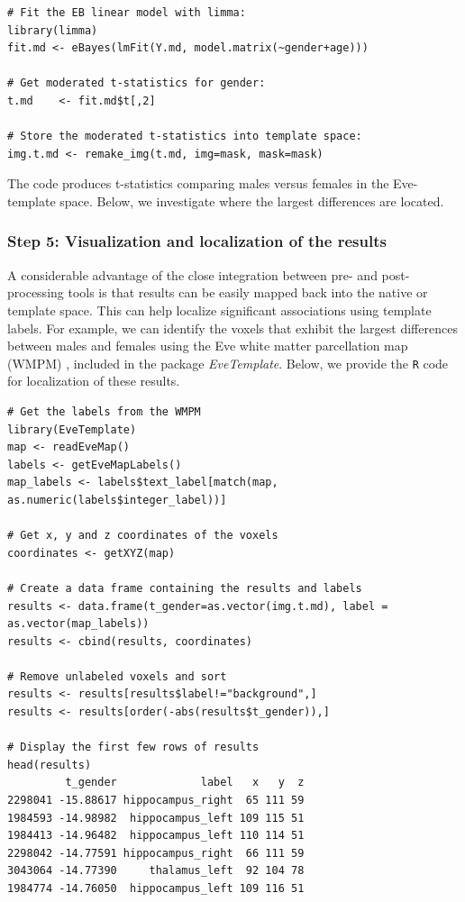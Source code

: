 \documentclass[]{elsarticle} %
\newcommand{\pkg}[1]{\emph{#1}}
\newcommand{\rlang}{\texttt{R}}
\begin{document}
\color{blue}
\begin{verbatim}
# Fit the EB linear model with limma:
library(limma)
fit.md <- eBayes(lmFit(Y.md, model.matrix(~gender+age)))

# Get moderated t-statistics for gender:
t.md    <- fit.md$t[,2]

# Store the moderated t-statistics into template space:
img.t.md <- remake_img(t.md, img=mask, mask=mask)
\end{verbatim}
\color{black}

The code produces t-statistics comparing males versus females in the Eve-template space.  Below, we investigate where the largest differences are located. 

\subsubsection{Step 5: Visualization and localization of the results}

A considerable advantage of the close integration between pre- and post-processing tools is that results can be easily mapped back into the native or template space. This can help localize significant associations using template labels. For example, we can identify the voxels that exhibit the largest differences between males and females using the Eve white matter parcellation map (WMPM) \citep{eve}, included in the package \pkg{EveTemplate}. Below, we provide the {\rlang}  code for localization of these results.

\color{blue}
\begin{verbatim}
# Get the labels from the WMPM
library(EveTemplate)
map <- readEveMap()
labels <- getEveMapLabels()
map_labels <- labels$text_label[match(map, as.numeric(labels$integer_label))] 

# Get x, y and z coordinates of the voxels
coordinates <- getXYZ(map)

# Create a data frame containing the results and labels
results <- data.frame(t_gender=as.vector(img.t.md), label = as.vector(map_labels))
results <- cbind(results, coordinates)

# Remove unlabeled voxels and sort  
results <- results[results$label!="background",]
results <- results[order(-abs(results$t_gender)),]

# Display the first few rows of results
head(results)
         t_gender             label   x   y  z
2298041 -15.88617 hippocampus_right  65 111 59
1984593 -14.98982  hippocampus_left 109 115 51
1984413 -14.96482  hippocampus_left 110 114 51
2298042 -14.77591 hippocampus_right  66 111 59
3043064 -14.77390     thalamus_left  92 104 78
1984774 -14.76050  hippocampus_left 109 116 51
\end{verbatim}
\color{black}
\end{document}
